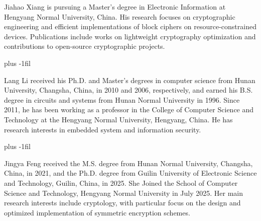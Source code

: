 \documentclass[final, twoside]{IEEEtran} %
\begin{document}
\begin{IEEEbiographynophoto}{Jiahao Xiang}
	is pursuing a Master's degree in Electronic Information at Hengyang Normal University, China. His research focuses on cryptographic engineering and efficient implementations of block ciphers on resource-constrained devices. Publications include works on lightweight cryptography optimization and contributions to open-source cryptographic projects.
\end{IEEEbiographynophoto}

\baselineskip plus -1fil

\begin{IEEEbiographynophoto}{Lang Li}
	received his Ph.D. and Master's degrees in computer science from Hunan University, Changsha, China, in 2010 and 2006, respectively, and earned his B.S. degree in circuits and systems from Hunan Normal University in 1996. Since 2011, he has been working as a professor in the College of Computer Science and Technology at the Hengyang Normal University, Hengyang, China. He has research interests in embedded system and information security.
\end{IEEEbiographynophoto}

\baselineskip plus -1fil

\begin{IEEEbiographynophoto} {Jingya Feng}
	received the M.S. degree from Hunan Normal University, Changsha, China, in 2021, and the Ph.D. degree from Guilin University of Electronic Science and Technology, Guilin, China, in 2025. She Joined the School of Computer Science and Technology, Hengyang Normal University in July 2025. Her main research interests include cryptology, with particular focus on the design and optimized implementation of symmetric encryption schemes.
\end{IEEEbiographynophoto}
\end{document}
